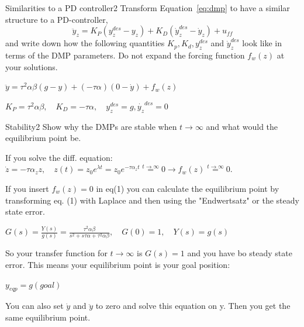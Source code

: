 \begin{questions}


\begin{question}{Similarities to a PD controller}{2}
Transform Equation~\eqref{eq:dmp} to have a similar structure to a PD-controller,
%
\begin{equation}
    \ddot{y}_z = K_P ( y^{des}_z - y_z ) + K_D ( \dot{y}_z^{des} - \dot{y}_z ) +
    u_{ff}
\end{equation}
%
and write down how the following quantities $K_p, K_d, y^{des}_z$ and $\dot{y}_z^{des}$ look like in terms of the DMP parameters. Do not expand the forcing function $f_w(z)$ at your solutions.

\begin{answer}
	$\ddot{y}=\tau^2 \alpha \beta (g-y) + (-\tau \alpha) (0-\dot{y}) +f_w(z)$	
	
	$K_P = \tau^2 \alpha \beta, \quad K_D= - \tau \alpha, \quad y_z^{des} = g , \dot{y_z}^{des}=0$
	\end{answer}

\end{question}


\begin{question}{Stability}{2}
Show why the DMPs are stable when $t\to\infty$ and what would the equilibrium point be.

\begin{answer}
	If you solve the diff. equation: $\dot{z}=-\tau\alpha_z z, \quad z(t)= z_0 e^{\lambda t}=z_0 e^{-\tau \alpha_z t} \overset{t \rightarrow \infty}{=}0 \rightarrow f_w(z) \overset{t \rightarrow \infty}{=}0 $.
	
	If you insert $f_w(z)=0$ in eq(1) you can calculate the equilibrium point by transforming eq. (1) with Laplace and then using the "Endwertsatz" or the steady state error.
	
	$G(s)=\frac{Y(s)}{g(s)}= \frac{\tau^2 \alpha \beta}{s^2 + s \tau \alpha + \tau^2 \alpha \beta },\quad G(0) = 1,\quad Y(s)=g(s)$
	
	So your transfer function for $t \rightarrow \infty$ is $G(s)=1$ and you have bo steady state error. This means your equilibrium point is your goal position: 
	
	$y_{eqp}=g (goal)$ 

	You can also set $\dot{y}$ and $\ddot{y}$ to zero and solve this equation on y. Then you get the same equilibrium point.
	\end{answer}


\end{question}
\end{questions}
